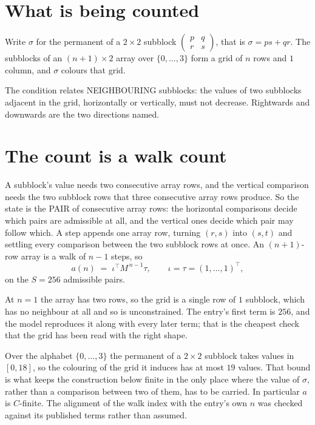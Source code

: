 \documentclass[11pt,a4paper]{article}
\theoremstyle{plain}
\theoremstyle{definition}
\begin{document}
\section{What is being counted}

Write $\sigma$ for the permanent of a $2\times2$ subblock
$\begin{pmatrix}p&q\\r&s\end{pmatrix}$, that is $\sigma=ps+qr$. The subblocks of an
$(n+1)\times2$ array over $\{0,\dots,3\}$ form a grid of $n$ rows and $1$
column, and $\sigma$ colours that grid.

The condition relates NEIGHBOURING subblocks: the values of two subblocks adjacent in the grid,
horizontally or vertically, must not decrease. Rightwards and downwards are the two directions named.

\section{The count is a walk count}

A subblock's value needs two consecutive array rows, and the vertical
comparison needs the two subblock rows that three consecutive array rows produce. So the state
is the PAIR of consecutive array rows: the horizontal comparisons decide which pairs are
admissible at all, and the vertical ones decide which pair may follow which. A step appends one
array row, turning $(r,s)$ into $(s,t)$ and settling every comparison between the two subblock
rows at once. An $(n+1)$-row array is a walk of $n-1$ steps, so
\[
a(n)\;=\;\iota^{\!\top}M^{\,n-1}\tau,\qquad\iota=\tau=(1,\dots,1)^{\!\top},
\]
on the $S=256$ admissible pairs.

At $n=1$ the array has two rows, so the grid is a single row of $1$
subblock, which has no neighbour at all and so is unconstrained. The
entry's first term is $256$, and the model reproduces it along with every later term; that
is the cheapest check that the grid has been read with the right shape.

Over the alphabet $\{0,\dots,3\}$ the permanent of a $2\times2$ subblock takes values in
$[0,18]$, so the colouring of the grid it induces has at most $19$ values.
That bound is what keeps the construction below finite in the only place where the value of
$\sigma$, rather than a comparison between two of them, has to be carried.
In particular $a$ is $C$-finite. The alignment of the walk index with the entry's own $n$ was
checked against its published terms rather than assumed.
\end{document}
